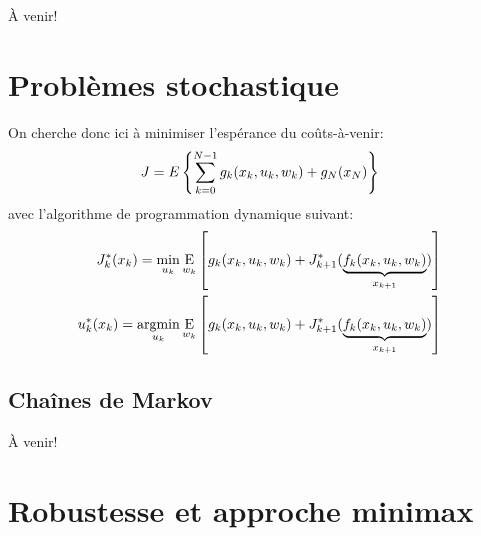 À venir!




\newpage
\section{Problèmes stochastique}


On cherche donc ici à minimiser l'espérance du coûts-à-venir:
\begin{align}
    J = \large{E} \left\{ \sum_{k=0}^{N-1} g_k(x_k, u_k , w_k) + g_N( x_N ) \right\}
\end{align}
avec l'algorithme de programmation dynamique suivant:
\begin{align}
J^*_k(x_k) = 
\operatornamewithlimits{min}\limits_{u_k}
\operatornamewithlimits{E}\limits_{w_k}
\left[
g_k(x_k , u_k , w_k ) + J^*_{k+1}( 
\underbrace{
f_k(x_k , u_k , w_k ) 
}_{x_{k+1}}
)
\right] \\
u^*_k(x_k) = 
\operatornamewithlimits{argmin}\limits_{u_k}
\operatornamewithlimits{E}\limits_{w_k}
\left[
g_k(x_k , u_k , w_k) + J^*_{k+1}( 
\underbrace{
f_k(x_k , u_k , w_k) 
}_{x_{k+1}}
)
\right] 
\end{align} 



\subsection{Chaînes de Markov}




À venir!

\section{Robustesse et approche minimax}

